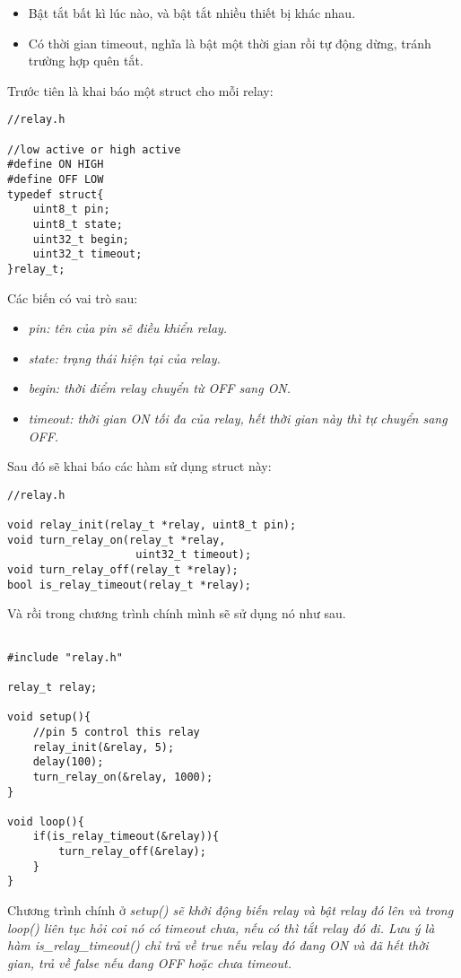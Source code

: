 \begin{itemize}
	\item Bật tắt bất kì lúc nào, và bật tắt nhiều thiết bị khác nhau.
	\item Có thời gian timeout, nghĩa là bật một thời gian rồi tự động dừng, tránh trường hợp quên tắt.
\end{itemize}

Trước tiên là khai báo một struct cho mỗi relay:
\begin{lstlisting}
//relay.h

//low active or high active
#define ON HIGH
#define OFF LOW
typedef struct{
	uint8_t pin;
	uint8_t state;
	uint32_t begin;
	uint32_t timeout;
}relay_t;
\end{lstlisting}

Các biến có vai trò sau:
\begin{itemize}
	\item \it{pin}: tên của pin sẽ điều khiển relay.
	\item \it{state}: trạng thái hiện tại của relay.
	\item \it{begin}: thời điểm relay chuyển từ OFF sang ON.
	\item \it{timeout}: thời gian ON tối đa của relay, hết thời gian này thì tự chuyển sang OFF.
\end{itemize}

Sau đó sẽ khai báo các hàm sử dụng struct này:

\begin{lstlisting}
//relay.h

void relay_init(relay_t *relay, uint8_t pin);
void turn_relay_on(relay_t *relay,
					uint32_t timeout);
void turn_relay_off(relay_t *relay);
bool is_relay_timeout(relay_t *relay);
\end{lstlisting}

Và rồi trong chương trình chính mình sẽ sử dụng nó như sau.
\begin{lstlisting}

#include "relay.h"

relay_t relay;

void setup(){
	//pin 5 control this relay
	relay_init(&relay, 5); 
	delay(100);
	turn_relay_on(&relay, 1000);
}

void loop(){
	if(is_relay_timeout(&relay)){
		turn_relay_off(&relay);
	}
}

\end{lstlisting}

Chương trình chính ở \it{setup()} sẽ khởi động biến relay và bật relay đó lên và trong \it{loop()} liên tục hỏi coi nó có timeout chưa, nếu có thì tắt relay đó đi. Lưu ý là hàm \it{is\_relay\_timeout()} chỉ trả về \it{true} nếu relay đó đang ON và đã hết thời gian, trả về \it{false} nếu đang \it{OFF} hoặc chưa \it{timeout}.

